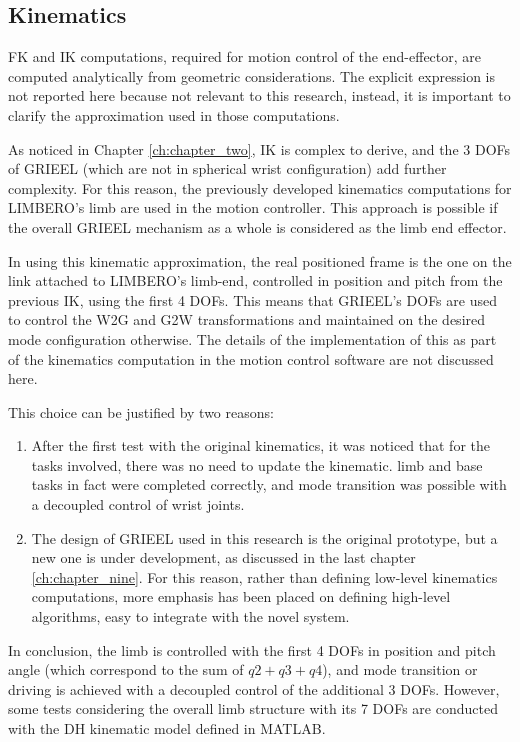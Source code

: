 \subsection{Kinematics}
\label{sec:kin}

FK and IK computations, required for motion control of the end-effector, are computed analytically from geometric considerations. The explicit expression is not reported here because not relevant to this research, instead, it is important to clarify the approximation used in those computations. 

As noticed in Chapter \ref{ch:chapter_two}, IK is complex to derive, and the 3 DOFs of GRIEEL (which are not in spherical wrist configuration\cite{Siciliano})  add further complexity. For this reason, the previously developed kinematics computations for LIMBERO's limb are used in the motion controller. This approach is possible if the overall GRIEEL mechanism as a whole is considered as the limb end effector. 

In using this kinematic approximation, the real positioned frame is the one on the link attached to LIMBERO's limb-end, controlled in position and pitch from the previous IK, using the first 4 DOFs. This means that GRIEEL's DOFs are used to control the W2G and G2W transformations and maintained on the desired mode configuration otherwise.  
The details of the implementation of this as part of the kinematics computation in the motion control software are not discussed here.

This choice can be justified by two reasons: 
\begin{enumerate}
   \setlength\itemsep{-0.7em} 
    \item After the first test with the original kinematics, it was noticed that for the tasks involved, there was no need to update the kinematic. 
    limb and base tasks in fact were completed correctly, and mode transition was possible with a decoupled control of wrist joints. 
    \item The design of GRIEEL used in this research is the original prototype, but a new one is under development, as discussed in the last chapter \ref{ch:chapter_nine}. For this reason, rather than defining low-level kinematics computations, more emphasis has been placed on defining high-level algorithms, easy to integrate with the novel system. 
\end{enumerate}

In conclusion, the limb is controlled with the first 4 DOFs in position and pitch angle (which correspond to the sum of $q2+q3+q4$), and mode transition or driving is achieved with a decoupled control of the additional 3 DOFs. However, some tests considering the overall limb structure with its 7 DOFs are conducted with the DH kinematic model defined in MATLAB.

